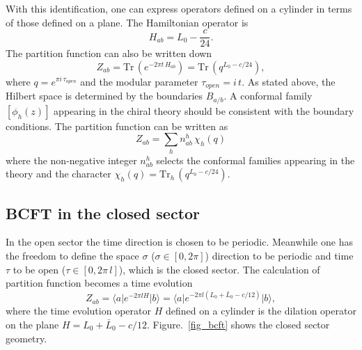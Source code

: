 \documentclass[submission, PhysLectNotes]{SciPost}
\begin{document}
With this identification, one can express operators defined on a cylinder in terms of those defined on a plane. The Hamiltonian operator is 
\begin{equation}
    H_{ab} = L_0 - \frac{c}{24}. 
\end{equation}
The partition function can also be written down 
\begin{equation}
    Z_{ab} = \mathrm{Tr}\,\left( e^{-2\pi t\, H_{ab}}\right) = \mathrm{Tr}\,\left( q^{L_0-c/24}\right),
\end{equation}
where $q=e^{\pi i\, \tau_{open}}$ and the modular parameter $\tau_{open} = i\,t$. As stated above, the Hilbert space is determined by the boundaries $B_{a/b}$. A conformal family $[\phi_{h}(z)]$ appearing in the chiral theory should be consistent with the boundary conditions. The partition function can be written as 
\begin{equation}
    Z_{ab} = \sum_h n_{ab}^h\, \chi_h(q)
\end{equation}
where the non-negative integer $n_{ab}^h$ selects the conformal families appearing in the theory and the character $\chi_h(q) = \mathrm{Tr}_h\,\left( q^{L_0-c/24}\right)$.

\subsection{BCFT in the closed sector}
In the open sector the time direction is chosen to be periodic. Meanwhile one has the freedom to define the space $\sigma$ ($\sigma \in [0,2\pi]$) direction to be periodic and time $\tau$ to be open ($\tau \in [0,2\pi\,l]$), which is the closed sector. The calculation of partition function becomes a time evolution
\begin{equation}
    Z_{ab} = \langle a \vert e^{-2\pi l H} \vert b \rangle = \langle a \vert e^{-2\pi l (L_0 + \bar{L}_0 -c/12)} \vert b \rangle,
\end{equation}
where the time evolution operator $H$ defined on a cylinder is the dilation operator on the plane $H = L_0 + \bar{L}_0 - c/12$. Figure.~\ref{fig_bcft} shows the closed sector geometry.
\end{document}
